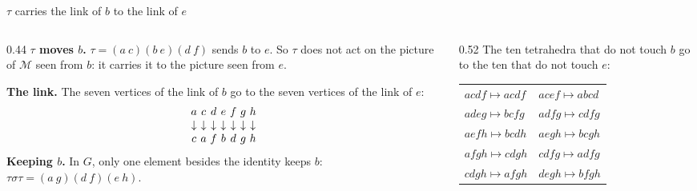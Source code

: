 \begin{frame}{\(\tau\) carries the link of \(b\) to the link of \(e\)}
\begin{columns}[t]
\begin{column}{0.44\textwidth}
\textbf{\(\tau\) moves \(b\).} \(\tau=(a\ c)(b\ e)(d\ f)\) sends \(b\) to \(e\). So \(\tau\) does not act on the picture of \(\mathcal M\) seen from \(b\): it carries it to the picture seen from \(e\).
\par
\textbf{The link.} The seven vertices of the link of \(b\) go to the seven vertices of the link of \(e\):
\[
\begin{array}{c@{\ }c@{\ }c@{\ }c@{\ }c@{\ }c@{\ }c}
a&c&d&e&f&g&h\\
\downarrow&\downarrow&\downarrow&\downarrow&\downarrow&\downarrow&\downarrow\\
c&a&f&b&d&g&h
\end{array}
\]
\textbf{Keeping \(b\).} In \(G\), only one element besides the identity keeps \(b\): \(\tau\sigma\tau=(a\ g)(d\ f)(e\ h)\).
\end{column}
\begin{column}{0.52\textwidth}\centering
\vspace{4mm}
{\small The ten tetrahedra that do not touch \(b\) go to the ten that do not touch \(e\):}
\par\medskip
\begin{tabular}{l@{\qquad}l}
\(acdf\mapsto acdf\) & \(acef\mapsto abcd\)\\
\(adeg\mapsto bcfg\) & \(adfg\mapsto cdfg\)\\
\(aefh\mapsto bcdh\) & \(aegh\mapsto bcgh\)\\
\(afgh\mapsto cdgh\) & \(cdfg\mapsto adfg\)\\
\(cdgh\mapsto afgh\) & \(degh\mapsto bfgh\)\\
\end{tabular}
\end{column}
\end{columns}
\end{frame}
\fi

